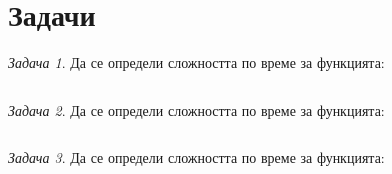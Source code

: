 \documentclass{article}
\theoremstyle{definition}
\theoremstyle{plain}
\theoremstyle{remark}
\newtheorem{problem}{Задача}
\theoremstyle{definition}
\begin{document}
\section*{Задачи}

\begin{problem}
Да се определи сложността по време за функцията:
\inputminted[linenos]{c++}{algorithms/task1.cpp}
\end{problem}

\begin{problem}
Да се определи сложността по време за функцията:
\inputminted[linenos]{c++}{algorithms/task2.cpp}
\end{problem}

\begin{problem}
Да се определи сложността по време за функцията:
\inputminted[linenos]{c++}{algorithms/task3.cpp}
\end{problem}
\end{document}
